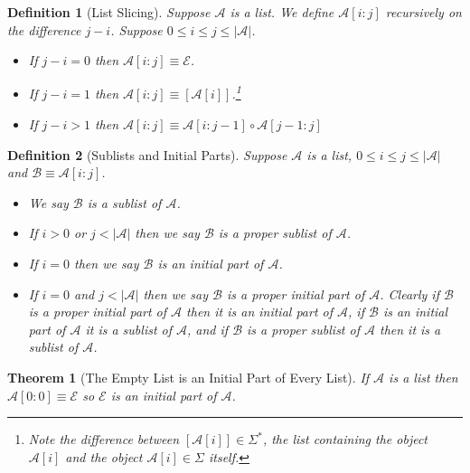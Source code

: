 \documentclass[12pt]{article}
\theoremstyle{break}
\newtheorem{definition}{Definition}[section]
\theoremstyle{break}
\newtheorem{theorem}{Theorem}[section]
\theoremstyle{break}
\theoremstyle{break}
\newcommand{\mc}[1]{\mathcal{#1}}
\begin{document}
\begin{definition}[List Slicing]
Suppose $\mc{A}$ is a list.
We define $\mc{A}[i:j]$ recursively on the difference $j-i$. Suppose $0 \le i \le j \le |\mc{A}|$.

\begin{itemize}
\item{If $j-i=0$ then $\mc{A}[i:j] \equiv \mc{E}$.}
\item{If $j-i=1$ then $\mc{A}[i:j] \equiv [\mc{A}[i]]$.\footnote{Note the difference between $[\mc{A}[i]]\in \Sigma^*$, the list containing the object $\mc{A}[i]$ and the object $\mc{A}[i]\in \Sigma$ itself.}}
\item{If $j-i>1$ then $\mc{A}[i:j] \equiv \mc{A}[i:j-1]\circ\mc{A}[j-1:j]$}
\end{itemize}
\end{definition}

\begin{definition}[Sublists and Initial Parts]
Suppose $\mc{A}$ is a list, $0\le i \le j \le |\mc{A}|$ and $\mc{B} \equiv \mc{A}[i:j]$.
\begin{itemize}
\item{We say $\mc{B}$ is a sublist of $\mc{A}$.}
\item{If $i>0$ or $j<|\mc{A}|$ then we say $\mc{B}$ is a proper sublist of $\mc{A}$.}
\item{If $i=0$ then we say $\mc{B}$ is an initial part of $\mc{A}$.}
\item{If $i=0$ and $j < |\mc{A}|$ then we say $\mc{B}$ is a proper initial part of $\mc{A}$.}
Clearly if $\mc{B}$ is a proper initial part of $\mc{A}$ then it is an initial part of $\mc{A}$, if $\mc{B}$ is an initial part of $\mc{A}$ it is a sublist of $\mc{A}$, and if $\mc{B}$ is a proper sublist of $\mc{A}$ then it is a sublist of $\mc{A}$.
\end{itemize}
\end{definition}

\begin{theorem}[The Empty List is an Initial Part of Every List]
\label{thm:emptylistinitialpart}
If $\mc{A}$ is a list then $\mc{A}[0:0] \equiv \mc{E}$ so $\mc{E}$ is an initial part of $\mc{A}$.
\end{theorem}
\end{document}
